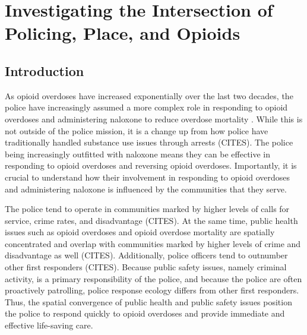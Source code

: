 \chapter{Investigating the Intersection of Policing, Place, and Opioids}



\section{\centering Introduction}
As opioid overdoses have increased exponentially over the last two decades, the police have increasingly assumed a more complex role in responding to opioid overdoses and administering naloxone to reduce overdose mortality \parencite{quinn_most_2019, ray_national_2023}. While this is not outside of the police mission, it is a change up from how police have traditionally handled substance use issues through arrests (CITES). The police being increasingly outfitted with naloxone means they can be effective in responding to opioid overdoses and reversing opioid overdoses. Importantly, it is crucial to understand how their involvement in responding to opioid overdoses and administering naloxone is influenced by the communities that they serve.

The police tend to operate in communities marked by higher levels of calls for service, crime rates, and disadvantage (CITES). At the same time, public health issues such as opioid overdoses and opioid overdose mortality are spatially concentrated and overlap with communities marked by higher levels of crime and disadvantage as well (CITES). Additionally, police officers tend to outnumber other first responders (CITES). Because public safety issues, namely criminal activity, is a primary responsibility of the police, and because the police are often proactively patrolling, police response ecology differs from other first responders. Thus, the spatial convergence of public health and public safety issues position the police to respond quickly to opioid overdoses and provide immediate and effective life-saving care.


